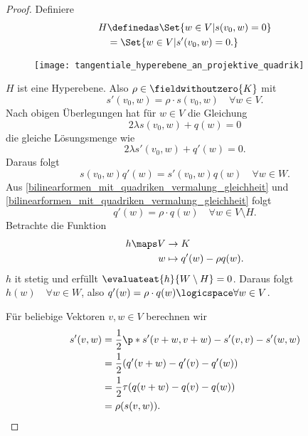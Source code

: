 \begin{proof}
  Definiere
  \begin{align*}
    H&\definedas \Set{w\in V|s(v_0,w)=0}\\
    &=\Set{w\in V|s'(v_0,w)=0.}
  \end{align*}
  \begin{figure}[H]
    \centering
    \texttt{[image: tangentiale\_hyperebene\_an\_projektive\_quadrik]}
    \label{fig:tangentiale_hyperebene_an_projektive_quadrik}
  \end{figure}
  \( H \) ist eine Hyperebene. Also \texists \( \rho\in \fieldwithoutzero{K} \) mit
  \begin{equation*}
    \tag{1}s'(v_0,w)=\rho\cdot s(v_0,w)\quad \forall w\in V.\label{teil_bilinearformen_sind_vielfache}
  \end{equation*}
  Nach obigen Überlegungen hat für \( w\in V \) die Gleichung
  \begin{equation*}
    2\lambda s(v_0,w)+q(w)=0
  \end{equation*}
  die gleiche Lösungsmenge wie
  \begin{equation*}
    2\lambda s'(v_0,w)+q'(w)=0.
  \end{equation*}
  Daraus folgt
  \begin{equation*}
    \tag{2}s(v_0,w)q'(w)=s'(v_0,w)q(w)\quad \forall w\in W.\label{bilinearformen_mit_quadriken_vermalung_gleichheit}
  \end{equation*}
  Aus \eqref{bilinearformen_mit_quadriken_vermalung_gleichheit} und \eqref{bilinearformen_mit_quadriken_vermalung_gleichheit} folgt
  \begin{equation*}
    q'(w)=\rho\cdot q(w)\quad \forall w\in V\setminus H.
  \end{equation*}
  Betrachte die Funktion
  \begin{align*}
    h\maps V&\to K\\
    w&\mapsto q'(w)-\rho q(w).
  \end{align*}
  \( h \) it stetig und erfüllt \( \evaluateat{h}{W\setminus H}=0 \). Daraus folgt \( h(w)\quad \forall w\in W \), also \( q'(w)=\rho\cdot q(w)\logicspace \forall w\in V\).

  Für beliebige Vektoren \( v,w\in V \) berechnen wir
  \begin{align*}
    s'(v,w)&=\frac{1}{2}\p*{s'(v+w,v+w)-s'(v,v)-s'(w,w)}\\
    &=\frac{1}{2}(q'(v+w)-q'(v)-q'(w))\\
    &=\frac{1}{2}\tau(q(v+w)-q(v)-q(w))\\
    &=\rho(s(v,w)).
  \end{align*}
\end{proof}
